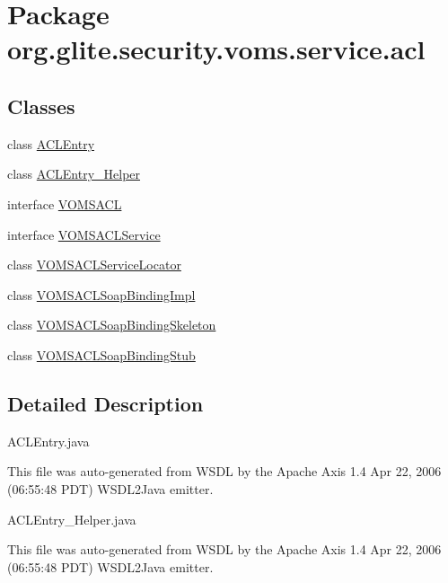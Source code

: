 \hypertarget{namespaceorg_1_1glite_1_1security_1_1voms_1_1service_1_1acl}{
\section{Package org.glite.security.voms.service.acl}
\label{namespaceorg_1_1glite_1_1security_1_1voms_1_1service_1_1acl}
}
\subsection*{Classes}
\begin{DoxyCompactItemize}
\item 
class \hyperlink{classorg_1_1glite_1_1security_1_1voms_1_1service_1_1acl_1_1ACLEntry}{ACLEntry}
\item 
class \hyperlink{classorg_1_1glite_1_1security_1_1voms_1_1service_1_1acl_1_1ACLEntry__Helper}{ACLEntry\_\-Helper}
\item 
interface \hyperlink{interfaceorg_1_1glite_1_1security_1_1voms_1_1service_1_1acl_1_1VOMSACL}{VOMSACL}
\item 
interface \hyperlink{interfaceorg_1_1glite_1_1security_1_1voms_1_1service_1_1acl_1_1VOMSACLService}{VOMSACLService}
\item 
class \hyperlink{classorg_1_1glite_1_1security_1_1voms_1_1service_1_1acl_1_1VOMSACLServiceLocator}{VOMSACLServiceLocator}
\item 
class \hyperlink{classorg_1_1glite_1_1security_1_1voms_1_1service_1_1acl_1_1VOMSACLSoapBindingImpl}{VOMSACLSoapBindingImpl}
\item 
class \hyperlink{classorg_1_1glite_1_1security_1_1voms_1_1service_1_1acl_1_1VOMSACLSoapBindingSkeleton}{VOMSACLSoapBindingSkeleton}
\item 
class \hyperlink{classorg_1_1glite_1_1security_1_1voms_1_1service_1_1acl_1_1VOMSACLSoapBindingStub}{VOMSACLSoapBindingStub}
\end{DoxyCompactItemize}


\subsection{Detailed Description}
ACLEntry.java

This file was auto-\/generated from WSDL by the Apache Axis 1.4 Apr 22, 2006 (06:55:48 PDT) WSDL2Java emitter.

ACLEntry\_\-Helper.java

This file was auto-\/generated from WSDL by the Apache Axis 1.4 Apr 22, 2006 (06:55:48 PDT) WSDL2Java emitter.

